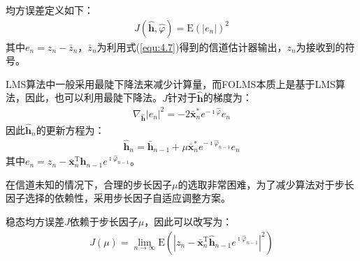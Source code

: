 均方误差定义如下：
\begin{eqnarray}
    J(\hat{\mathbf{h}},\hat{\varphi})=\mathrm{E}(|e_n|)^2
    \label{equ:4.8}
\end{eqnarray}
其中$e_n=z_n-\bar{z}_n$，$\bar{z}_n$为利用式(\ref{equ:4.7})得到的信道估计器输出，$z_n$为接收到的符号。

LMS算法中一般采用最陡下降法来减少计算量，而FOLMS本质上是基于LMS算法，因此，也可以利用最陡下降法。$J$针对于$\hat{\mathbf{h}}$的梯度为：
\begin{eqnarray}
    \nabla_{\hat{\mathbf{h}}}|e_n|^2=-2\bar{\mathbf{x}}_n^*e^{-\imath\hat{\varphi}}e_n
    \label{equ:4.9}
\end{eqnarray}
因此$\hat{\mathbf{h}}_n$的更新方程为：
\begin{eqnarray}
    \hat{\mathbf{h}}_n=\bar{\mathbf{h}}_{n-1}+\mu\bar{\mathbf{x}}_n^*e^{-\imath\hat{\varphi}_{n-1}}e_n
    \label{equ:4.10}
\end{eqnarray}
其中$e_n=z_n-\bar{\mathbf{x}}_n^{\mathrm{T}}\hat{\mathbf{h}}_{n-1}e^{\imath\hat{\varphi}_{n-1}}$。

在信道未知的情况下，合理的步长因子$\mu$的选取非常困难，为了减少算法对于步长因子选择的依赖性，采用步长因子自适应调整方案。

稳态均方误差$J$依赖于步长因子$\mu$，因此可以改写为：
\begin{eqnarray}
    J(\mu)=\lim_{n\rightarrow\infty}\mathrm{E}(|z_n-\bar{\mathbf{x}}_n^{\mathrm{T}}\hat{\mathbf{h}}_{n-1}e^{\imath\hat{\varphi}_{n-1}}|^2)
    \label{equ:4.11}
\end{eqnarray}

